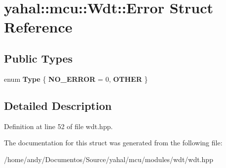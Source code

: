 \hypertarget{structyahal_1_1mcu_1_1_wdt_1_1_error}{}\section{yahal\+:\+:mcu\+:\+:Wdt\+:\+:Error Struct Reference}
\label{structyahal_1_1mcu_1_1_wdt_1_1_error}
\subsection*{Public Types}
\begin{DoxyCompactItemize}
\item 
\hypertarget{structyahal_1_1mcu_1_1_wdt_1_1_error_aca128594025d015df655e4e9c311e5b2}{}enum {\bfseries Type} \{ {\bfseries N\+O\+\_\+\+E\+R\+R\+O\+R} = 0, 
{\bfseries O\+T\+H\+E\+R}
 \}\label{structyahal_1_1mcu_1_1_wdt_1_1_error_aca128594025d015df655e4e9c311e5b2}

\end{DoxyCompactItemize}


\subsection{Detailed Description}


Definition at line 52 of file wdt.\+hpp.



The documentation for this struct was generated from the following file\+:\begin{DoxyCompactItemize}
\item 
/home/andy/\+Documentos/\+Source/yahal/mcu/modules/wdt/wdt.\+hpp\end{DoxyCompactItemize}
